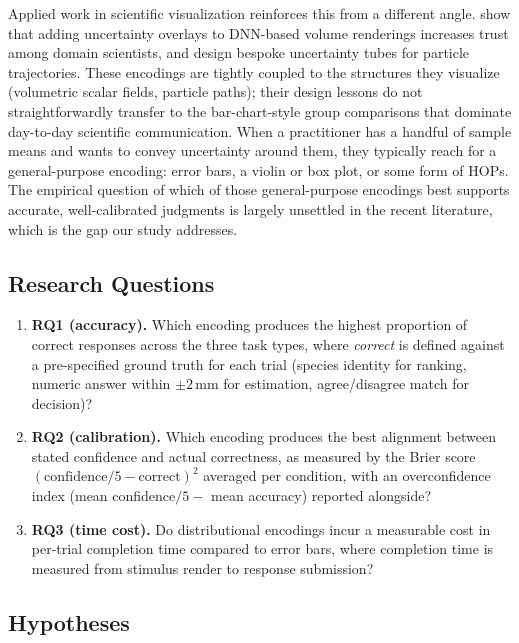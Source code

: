 \documentclass{article}
\begin{document}
Applied work in scientific visualization reinforces this from a
different angle.  \textcite{saklani2024} show that adding uncertainty
overlays to DNN-based volume renderings increases trust among domain
scientists, and \textcite{li2025} design bespoke uncertainty tubes for
particle trajectories.  These encodings are tightly coupled to the
structures they visualize (volumetric scalar fields, particle paths);
their design lessons do not straightforwardly transfer to the
bar-chart-style group comparisons that dominate day-to-day scientific
communication.  When a practitioner has a handful of sample means and
wants to convey uncertainty around them, they typically reach for a
general-purpose encoding: error bars, a violin or box plot, or some
form of HOPs.  The empirical question of which of those general-purpose
encodings best supports accurate, well-calibrated judgments is largely
unsettled in the recent literature, which is the gap our study
addresses.

\subsection{Research Questions}

\begin{enumerate}[leftmargin=*, itemsep=4pt]
\item \textbf{RQ1 (accuracy).}  Which encoding produces the highest
  proportion of correct responses across the three task types, where
  \emph{correct} is defined against a pre-specified ground truth for
  each trial (species identity for ranking, numeric answer within
  $\pm 2$\,mm for estimation, agree/disagree match for decision)?
\item \textbf{RQ2 (calibration).}  Which encoding produces the best
  alignment between stated confidence and actual correctness, as
  measured by the Brier score
  $(\text{confidence}/5 - \text{correct})^2$ averaged per condition,
  with an overconfidence index (mean confidence$/5 -$ mean accuracy)
  reported alongside?
\item \textbf{RQ3 (time cost).}  Do distributional encodings incur a
  measurable cost in per-trial completion time compared to error bars,
  where completion time is measured from stimulus render to response
  submission?
\end{enumerate}

\subsection{Hypotheses}
\end{document}
